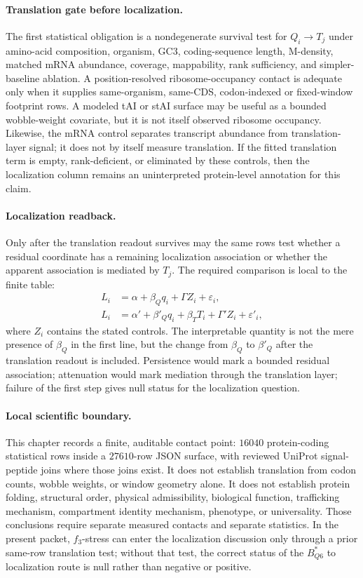 \paragraph{Translation gate before localization.}
The first statistical obligation is a nondegenerate survival test for $Q_i \to T_j$ under amino-acid composition, organism, GC3, coding-sequence length, M-density, matched mRNA abundance, coverage, mappability, rank sufficiency, and simpler-baseline ablation.  A position-resolved ribosome-occupancy contact is adequate only when it supplies same-organism, same-CDS, codon-indexed or fixed-window footprint rows.  A modeled tAI or stAI surface may be useful as a bounded wobble-weight covariate, but it is not itself observed ribosome occupancy.  Likewise, the mRNA control separates transcript abundance from translation-layer signal; it does not by itself measure translation.  If the fitted translation term is empty, rank-deficient, or eliminated by these controls, then the localization column remains an uninterpreted protein-level annotation for this claim.

\paragraph{Localization readback.}
Only after the translation readout survives may the same rows test whether a residual coordinate has a remaining localization association or whether the apparent association is mediated by $T_j$.  The required comparison is local to the finite table:
$$
\begin{aligned}
  L_i &= \alpha + \beta_Q q_i + \Gamma Z_i + \varepsilon_i,\\
  L_i &= \alpha' + \beta'_Q q_i + \beta_T T_i + \Gamma' Z_i + \varepsilon'_i,
\end{aligned}
$$
where $Z_i$ contains the stated controls.  The interpretable quantity is not the mere presence of $\beta_Q$ in the first line, but the change from $\beta_Q$ to $\beta'_Q$ after the translation readout is included.  Persistence would mark a bounded residual association; attenuation would mark mediation through the translation layer; failure of the first step gives null status for the localization question.

\paragraph{Local scientific boundary.}
This chapter records a finite, auditable contact point: $16040$ protein-coding statistical rows inside a $27610$-row JSON surface, with reviewed UniProt signal-peptide joins where those joins exist.  It does not establish translation from codon counts, wobble weights, or window geometry alone.  It does not establish protein folding, structural order, physical admissibility, biological function, trafficking mechanism, compartment identity mechanism, phenotype, or universality.  Those conclusions require separate measured contacts and separate statistics.  In the present packet, $f_3$-stress can enter the localization discussion only through a prior same-row translation test; without that test, the correct status of the $B^{*}_{Q6}$ to localization route is null rather than negative or positive.